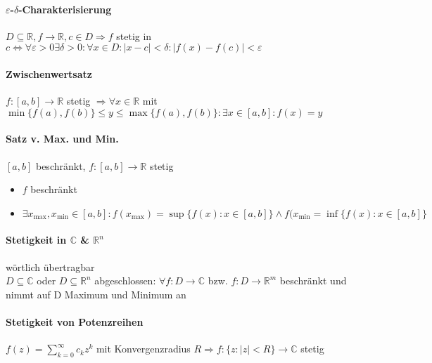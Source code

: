 \documentclass[paper=a3,paper=landscape, fontsize=9pt,DIV=25]{scrartcl}
\newcommand{\real}{{\mathbb{R}}}
\newcommand{\compl}{\mathbb{C}}
\begin{document}
\begin{multicols*}{4}
  \paragraph{$\varepsilon$-$\delta$-Charakterisierung}
  $D \subseteq \real, f \rightarrow \real, c \in D \Rightarrow f$ stetig in $c \Leftrightarrow \forall \varepsilon > 0 \exists \delta > 0: \forall x \in D: \lvert x - c \rvert < \delta: \lvert f(x)-f(c)\rvert < \varepsilon$


  \paragraph{Zwischenwertsatz}
  $f:[a,b] \rightarrow \real$ stetig $\Rightarrow \forall x \in \real$ mit $ \min\{f(a),f(b)\} \leq y \leq \max\{f(a), f(b)\}: \exists x \in [a,b]: f(x)=y$


  \paragraph{Satz v. Max. und Min.}
  $[a,b]$ beschränkt, $f: [a,b] \rightarrow \real$ stetig
  \begin{itemize}
  \item $f$ beschränkt
  \item $\exists x_{\max}, x_{\min} \in [a,b]: f(x_{\max})=\sup\{f(x): x \in [a,b]\} \wedge f(x_{\min}=\inf\{f(x):x \in [a,b]\}$
  \end{itemize}


  \paragraph{Stetigkeit in $\compl$ \& $\real ^n$} wörtlich übertragbar\\
  $D \subseteq \compl$ oder $D \subseteq \real^n$ abgeschlossen: $\forall f: D \rightarrow \compl$ bzw. $f: D \rightarrow \real^m$ beschränkt und nimmt auf D Maximum und Minimum an


  \paragraph{Stetigkeit von Potenzreihen}
  $ f(z)=\sum_{k=0}^{\infty} c_kz^k$ mit Konvergenzradius $R \Rightarrow f: \{z: \lvert z \rvert < R \} \rightarrow \compl$ stetig




\end{multicols*}
\end{document}
